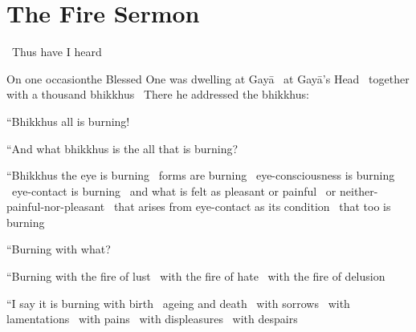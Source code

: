 \section{The Fire Sermon}
\label{fire-sermon}

\begin{leader-english}
  \anglebracketleft\ \hspace{-0.5mm}Thus have I heard \hspace{-0.5mm}\anglebracketright\
\end{leader-english}

\begin{english-only-hang}
  On one occasion\makeatletter\hyperlink{endnote113-appendix}\makeatother\thinspace the Blessed One was dwelling at Gayā \breathmark\ at Gayā's Head \breathmark\ together with a thousand bhikkhus \breathmark\ There he addressed the bhikkhus:
\end{english-only-hang}

\begin{english-only-hang}
  ``Bhikkhus all is burning!
\end{english-only-hang}

\begin{english-only-hang}
  ``And what bhikkhus is the all that is burning?
\end{english-only-hang}

\begin{english-only-hang}
  ``Bhikkhus the eye is burning \breathmark\ forms are burning \breathmark\ eye-consciousness is burning \breathmark\ eye-contact is burning \breathmark\ and what is felt as pleasant or painful \breathmark\ or neither-painful-nor-pleasant \breathmark\ that arises from eye-contact as its condition \breathmark\ that too is burning
\end{english-only-hang}
\begin{english-only-hangtogether}
  ``Burning with what?
\end{english-only-hangtogether}
\begin{english-only-hangtogether}
  ``Burning with the fire of lust \breathmark\ with the fire of hate \breathmark\ with the fire of delusion
\end{english-only-hangtogether}
\begin{english-only-hangtogether}
  ``I say it is burning with birth \breathmark\ ageing and death \breathmark\ with sorrows \breathmark\ with lamentations \breathmark\ with pains \breathmark\ with displeasures \breathmark\ with despairs
\end{english-only-hangtogether}


